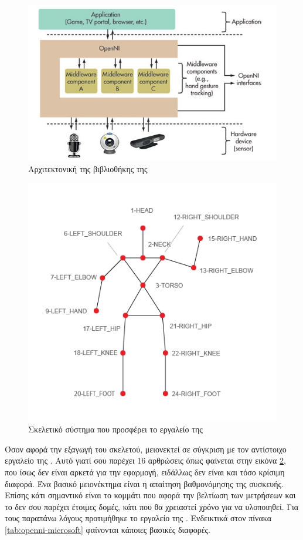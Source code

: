 \begin{figure}[H]
    \centering
    \includegraphics[width=.7\textwidth, height=.3\textheight]{fig/openni-framework.jpg}
    \caption{Αρχιτεκτονική της βιβλιοθήκης της \protect\footnotemark}
    \label{fig:openni-framework}
\end{figure}

\begin{figure}[H]
    \centering
    \includegraphics[width=.5\textwidth]{fig/openni-skeleton.png}
    \caption{Σκελετικό σύστημα που προσφέρει το εργαλείο της }
    \label{fig:openni-skeleton}
\end{figure}

Όσον αφορά την εξαγωγή του σκελετού, μειονεκτεί σε σύγκριση με τον αντίστοιχο εργαλείο της . Αυτό γιατί σου παρέχει 16 αρθρώσεις όπως φαίνεται στην εικόνα \ref{fig:openni-skeleton}, που ίσως δεν είναι αρκετά για την εφαρμογή, ειδάλλως δεν είναι και τόσο κρίσιμη διαφορά. Ένα βασικό μειονέκτημα είναι η απαίτηση βαθμονόμησης της συσκευής. Επίσης κάτι σημαντικό είναι το κομμάτι που αφορά την βελτίωση των μετρήσεων και το  δεν σου παρέχει έτοιμες δομές, κάτι που θα χρειαστεί χρόνο για να υλοποιηθεί. Για τους παραπάνω λόγους προτιμήθηκε το εργαλείο της . Ενδεικτικά στον πίνακα \ref{tab:openni-microsoft} φαίνονται κάποιες βασικές διαφορές.

